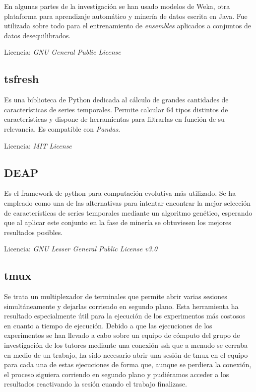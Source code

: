 En algunas partes de la investigación se han usado modelos de Weka, otra plataforma para aprendizaje automático y minería de datos escrita en Java. Fue utilizada sobre todo para el entrenamiento de \textit{ensembles} aplicados a conjuntos de datos desequilibrados.

Licencia: \textit{GNU General Public License}

\subsection{tsfresh}

Es una biblioteca de Python dedicada al cálculo de grandes cantidades de características de series temporales. Permite calcular 64 tipos distintos de características y dispone de herramientas para filtrarlas en función de su relevancia. Es compatible con \textit{Pandas}. 

Licencia: \textit{MIT License }

\subsection{DEAP}

Es el framework de python para computación evolutiva más utilizado. Se ha empleado como una de las alternativas para intentar encontrar la mejor selección de características de series temporales mediante un algoritmo genético, esperando que al aplicar este conjunto en la fase de minería se obtuviesen los mejores resultados posibles.  

Licencia: \textit{GNU Lesser General Public License v3.0}

\subsection{tmux}

Se trata un multiplexador de terminales que permite abrir varias sesiones simultáneamente y dejarlas corriendo en segundo plano. Esta herramienta ha resultado especialmente útil para la ejecución de los experimentos más costosos en cuanto a tiempo de ejecución. Debido a que las ejecuciones de los experimentos se han llevado a cabo sobre un equipo de cómputo del grupo de investigación de los tutores mediante una conexión ssh que a menudo se cerraba en medio de un trabajo, ha sido necesario abrir una sesión de tmux en el equipo para cada una de estas ejecuciones de forma que, aunque se perdiera la conexión, el proceso siguiera corriendo en segundo plano y pudiéramos acceder a los resultados reactivando la sesión cuando el trabajo finalizase.


